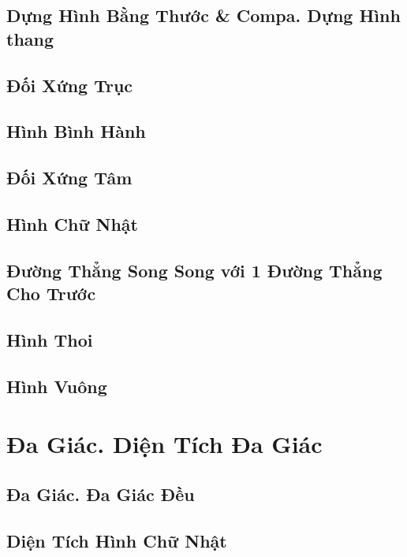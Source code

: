 \documentclass[oneside]{book}
\numberwithin{equation}{section}
\begin{document}
\section{Dựng Hình Bằng Thước \& Compa. Dựng Hình thang}

\section{Đối Xứng Trục}

\section{Hình Bình Hành}

\section{Đối Xứng Tâm}

\section{Hình Chữ Nhật}

\section{Đường Thẳng Song Song với 1 Đường Thẳng Cho Trước}

\section{Hình Thoi}

\section{Hình Vuông}


\chapter{Đa Giác. Diện Tích Đa Giác}

\section{Đa Giác. Đa Giác Đều}

\section{Diện Tích Hình Chữ Nhật}
\end{document}
